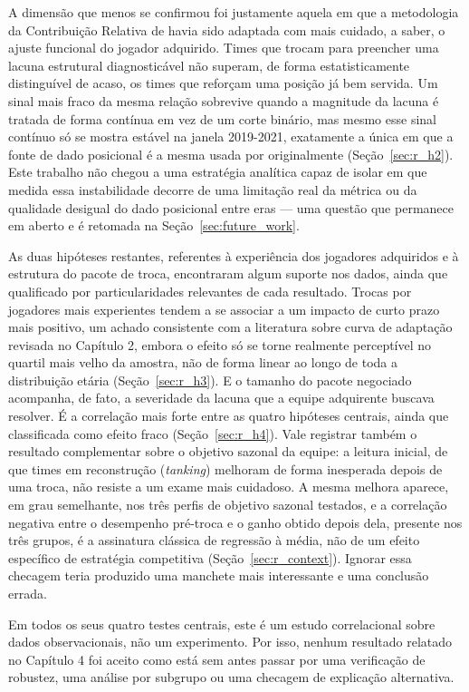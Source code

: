 A dimensão que menos se confirmou foi justamente aquela em que a metodologia da Contribuição Relativa de \citet{sa2025} havia sido adaptada com mais cuidado, a saber, o ajuste funcional do jogador adquirido. Times que trocam para preencher uma lacuna estrutural diagnosticável não superam, de forma estatisticamente distinguível de acaso, os times que reforçam uma posição já bem servida. Um sinal mais fraco da mesma relação sobrevive quando a magnitude da lacuna é tratada de forma contínua em vez de um corte binário, mas mesmo esse sinal contínuo só se mostra estável na janela 2019-2021, exatamente a única em que a fonte de dado posicional é a mesma usada por \citet{sa2025} originalmente (Seção~\ref{sec:r_h2}). Este trabalho não chegou a uma estratégia analítica capaz de isolar em que medida essa instabilidade decorre de uma limitação real da métrica ou da qualidade desigual do dado posicional entre eras — uma questão que permanece em aberto e é retomada na Seção~\ref{sec:future_work}.

As duas hipóteses restantes, referentes à experiência dos jogadores adquiridos e à estrutura do pacote de troca, encontraram algum suporte nos dados, ainda que qualificado por particularidades relevantes de cada resultado. Trocas por jogadores mais experientes tendem a se associar a um impacto de curto prazo mais positivo, um achado consistente com a literatura sobre curva de adaptação revisada no Capítulo 2, embora o efeito só se torne realmente perceptível no quartil mais velho da amostra, não de forma linear ao longo de toda a distribuição etária (Seção~\ref{sec:r_h3}). E o tamanho do pacote negociado acompanha, de fato, a severidade da lacuna que a equipe adquirente buscava resolver. É a correlação mais forte entre as quatro hipóteses centrais, ainda que classificada como efeito fraco (Seção~\ref{sec:r_h4}). Vale registrar também o resultado complementar sobre o objetivo sazonal da equipe: a leitura inicial, de que times em reconstrução (\textit{tanking}) melhoram de forma inesperada depois de uma troca, não resiste a um exame mais cuidadoso. A mesma melhora aparece, em grau semelhante, nos três perfis de objetivo sazonal testados, e a correlação negativa entre o desempenho pré-troca e o ganho obtido depois dela, presente nos três grupos, é a assinatura clássica de regressão à média, não de um efeito específico de estratégia competitiva (Seção~\ref{sec:r_context}). Ignorar essa checagem teria produzido uma manchete mais interessante e uma conclusão errada.

Em todos os seus quatro testes centrais, este é um estudo correlacional sobre dados observacionais, não um experimento. Por isso, nenhum resultado relatado no Capítulo 4 foi aceito como está sem antes passar por uma verificação de robustez, uma análise por subgrupo ou uma checagem de explicação alternativa.

